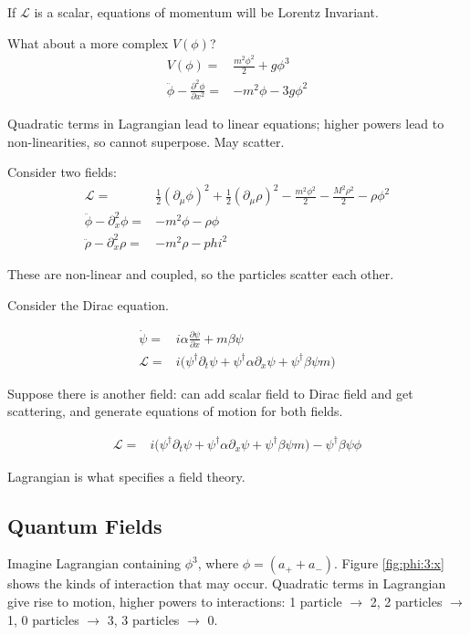 \documentclass[]{article}
\begin{document}
If $\mathcal{L}$ is a scalar, equations of momentum will be Lorentz Invariant.

What about a more complex $V(\phi)$?
\begin{align*}
	V(\phi) =& \frac{m^2 \phi^2}{2} + g \phi^3\\
	\ddot{\phi} - \frac{\partial^2 \phi}{\partial x^2}  =& - m^2 \phi - 3 g \phi^2
\end{align*}

Quadratic terms in Lagrangian lead to linear equations; higher powers lead to non-linearities, so cannot superpose. May scatter.

Consider two fields:
\begin{align*}
	\mathcal{L} =& \frac{1}{2}(\partial_{\mu} \phi)^2 + \frac{1}{2}(\partial_{\mu} \rho)^2 - \frac{m^2 \phi^2}{2} - \frac{M^2 \rho^2}{2} - \rho \phi^2\\
	\ddot{\phi} - \partial_x^2 \phi =& -m^2 \phi - \rho \phi
	\\
	\ddot{\rho} - \partial_x^2 \rho =& -m^2 \rho -phi^2
\end{align*}

These are non-linear and coupled, so the particles scatter each other.

Consider the Dirac equation.

\begin{align*}
\dot{\psi} =& i \alpha \frac{\partial \psi}{\partial x} + m \beta \psi\\
\mathcal{L} =& i \big( \psi^\dagger \partial_t \psi +  \psi^\dagger \alpha \partial_x \psi + \psi^\dagger \beta \psi m \big)
\end{align*}

Suppose there is another field: can add scalar field to Dirac field and get scattering, and generate equations of motion for both fields.

\begin{align*}
\mathcal{L} =& i \big( \psi^\dagger \partial_t \psi +  \psi^\dagger \alpha \partial_x \psi + \psi^\dagger \beta \psi m \big) - \psi^\dagger \beta \psi \phi
\end{align*}

Lagrangian is what specifies a field theory.

\subsection{Quantum Fields}

Imagine Lagrangian containing $\phi^3$, where $\phi = (a_+ + a_-)$.
Figure \ref{fig:phi:3:x} shows the kinds of interaction that may occur. Quadratic terms in Lagrangian give rise to motion, higher powers to interactions: 1 particle $\rightarrow$ 2, 2 particles $\rightarrow$ 1, 0 particles $\rightarrow$ 3, 3 particles $\rightarrow$ 0.
 
\end{document}
